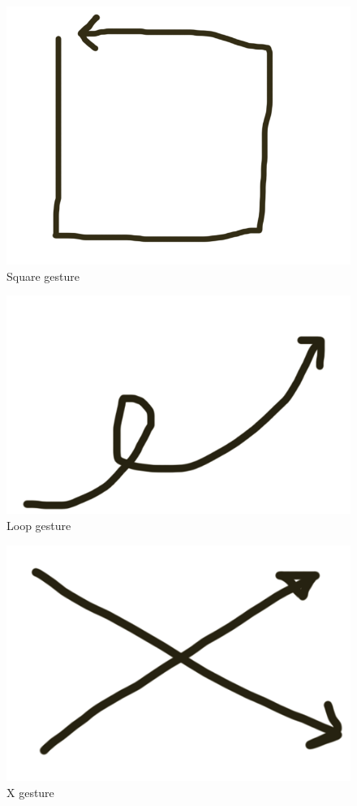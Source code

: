 \documentclass[12pt]{article}
\begin{document}
\begin{figure}[h!]
\centering
\includegraphics[scale=0.4]{square.png}
\caption{Square gesture}
\end{figure}

\begin{figure}[h!]
\centering
\includegraphics[scale=0.4]{loop.png}
\caption{Loop gesture}
\end{figure}

\begin{figure}[h!]
\centering
\includegraphics[scale=0.4]{X.png}
\caption{X gesture}
\end{figure}
\end{document}
